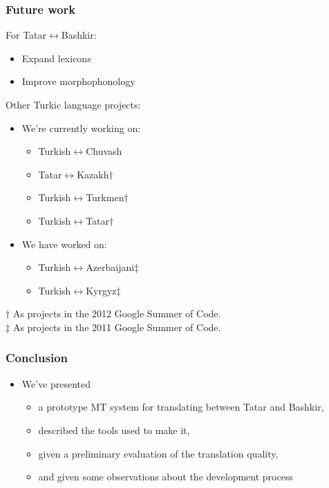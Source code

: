 \documentclass[10pt,xetex]{beamer} %
\begin{document}
\begin{frame}
  \frametitle{Future work}

\begin{block}{For Tatar$\leftrightarrow$Bashkir:}
  \begin{itemize}
    \item Expand lexicons 
    \item Improve morphophonology
  \end{itemize}
\end{block}

\begin{block}{Other Turkic language projects:}
  \begin{itemize}
    \item We're currently working on:

    \begin{itemize}
      \item Turkish$\leftrightarrow$Chuvash
      \item Tatar$\leftrightarrow$Kazakh$\dag$
      \item Turkish$\leftrightarrow$Turkmen$\dag$
      \item Turkish$\leftrightarrow$Tatar$\dag$
    \end{itemize}

    \item We have worked on: 
    \begin{itemize}
      \item Turkish$\leftrightarrow$Azerbaijani$\ddag$
      \item Turkish$\leftrightarrow$Kyrgyz$\ddag$
    \end{itemize}
  \end{itemize}
  $\dag$ As projects in the 2012 Google Summer of Code. \\
  $\ddag$ As projects in the 2011 Google Summer of Code.
\end{block}

\end{frame}

\begin{frame}
  \frametitle{Conclusion}

\begin{block} %

  \begin{itemize}
    \item We've presented
    \begin{itemize}
      \item a prototype MT system for translating between Tatar and Bashkir,
      \item described the tools used to make it,
      \item given a preliminary evaluation of the translation quality,
      \item and given some observations about the development process
    \end{itemize}
  \end{itemize}


\end{block}

\end{frame}
\end{document}

